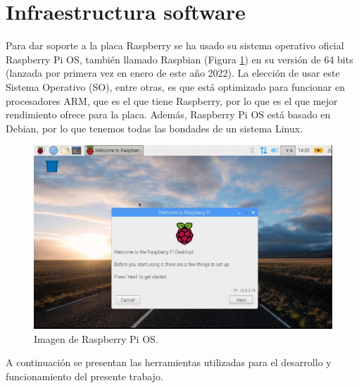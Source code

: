 \section{Infraestructura software}
Para dar soporte a la placa Raspberry se ha usado su sistema operativo oficial Raspberry Pi OS, también llamado Raspbian (Figura \ref{fig:raspbian}) en su versión de 64 bits (lanzada por primera vez en enero de este año 2022). La elección de usar este Sistema Operativo (SO), entre otras, es que está optimizado para funcionar en procesadores ARM, que es el que tiene Raspberry, por lo que es el que mejor rendimiento ofrece para la placa. Además, Raspberry Pi OS está basado en Debian, por lo que tenemos todas las bondades de un sistema Linux.\\
\begin{figure} [h!]
  \begin{center}
    \includegraphics[width=14cm]{figs/raspbian}
  \end{center}
  \caption{Imagen de Raspberry Pi OS.}
  \label{fig:raspbian}
\end{figure}

A continuación se presentan las herramientas utilizadas para el desarrollo y funcionamiento del presente trabajo.


